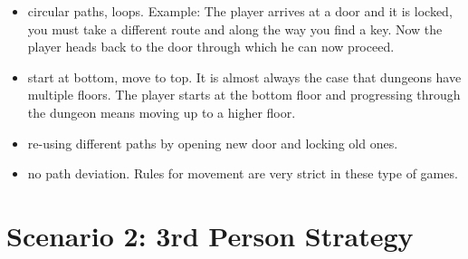 \begin{itemize}
\item circular paths, loops. Example: The player arrives at a door and it is locked, you must take a different route and along the way you find a key. Now the player heads back to the door through which he can now proceed.  
\item start at bottom, move to top. It is almost always the case that dungeons have multiple floors. The player starts at the bottom floor and progressing through the dungeon means moving up to a higher floor.      
\item re-using different paths by opening new door and locking old ones.    
\item no path deviation. Rules for movement are very strict in these type of games.

\end{itemize}



\section{Scenario 2: 3rd Person Strategy}


% 
%
%
%



% 
%
%
%
%



